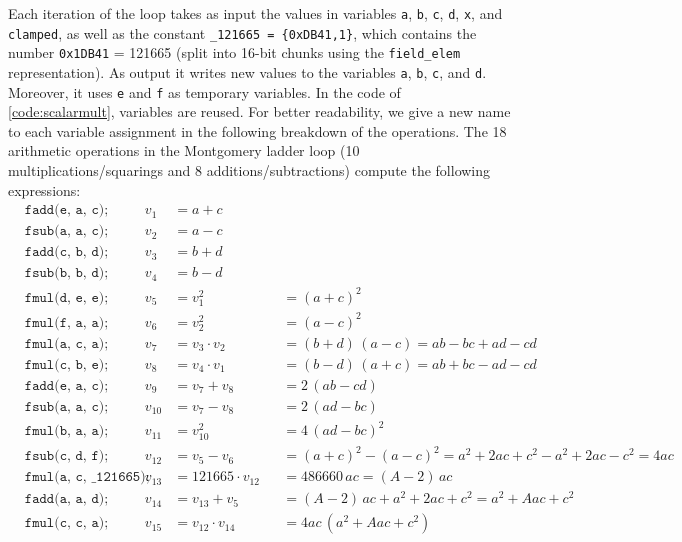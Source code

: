 \documentclass[manuscript]{acmart}
\begin{document}
Each iteration of the loop takes as input the values in variables \verb|a|, \verb|b|, \verb|c|, \verb|d|, \verb|x|, and \verb|clamped|, as well as the constant \verb|_121665 = {0xDB41,1}|, which contains the number \verb|0x1DB41| = 121665 (split into 16-bit chunks using the \verb|field_elem| representation).
As output it writes new values to the variables \verb|a|, \verb|b|, \verb|c|, and \verb|d|.
Moreover, it uses \verb|e| and \verb|f| as temporary variables.
In the code of \autoref{code:scalarmult}, variables are reused.
For better readability, we give a new name to each variable assignment in the following breakdown of the operations.
The 18 arithmetic operations in the Montgomery ladder loop (10 multiplications/squarings and 8 additions/subtractions) compute the following expressions:
\begingroup
\allowdisplaybreaks
\begin{align*}
    & \texttt{fadd(e, a, c);} & v_1    &= a + c \\
    & \texttt{fsub(a, a, c);} & v_2    &= a - c \\
    & \texttt{fadd(c, b, d);} & v_3    &= b + d \\
    & \texttt{fsub(b, b, d);} & v_4    &= b - d \\
    & \texttt{fmul(d, e, e);} & v_5    &= v_1^2          &&= (a + c)^2 \\
    & \texttt{fmul(f, a, a);} & v_6    &= v_2^2          &&= (a - c)^2 \\
    & \texttt{fmul(a, c, a);} & v_7    &= v_3 \cdot v_2  &&= (b + d)\,(a - c) = ab - bc + ad - cd \\
    & \texttt{fmul(c, b, e);} & v_8    &= v_4 \cdot v_1  &&= (b - d)\,(a + c) = ab + bc - ad - cd \\
    & \texttt{fadd(e, a, c);} & v_9    &= v_7 + v_8      &&= 2\,(ab - cd) \\
    & \texttt{fsub(a, a, c);} & v_{10} &= v_7 - v_8      &&= 2\,(ad - bc) \\
    & \texttt{fmul(b, a, a);} & v_{11} &= v_{10}^2       &&= 4\,(ad - bc)^2 \\
    & \texttt{fsub(c, d, f);} & v_{12} &= v_5 - v_6      &&= (a + c)^2 - (a - c)^2 = a^2 + 2ac + c^2 - a^2 + 2ac - c^2 = 4ac \\
    & \texttt{fmul(a, c, {\char`_}121665);} & v_{13} &= 121665 \cdot v_{12} &&= 486660\, ac = (A - 2)\,ac \\
    & \texttt{fadd(a, a, d);} & v_{14} &= v_{13} + v_5   &&= (A - 2)\,ac + a^2 + 2ac + c^2 = a^2 + Aac + c^2 \\
    & \texttt{fmul(c, c, a);} & v_{15} &= v_{12} \cdot v_{14} &&= 4ac\, (a^2 + Aac + c^2) \\

\end{align*}
\end{document}
